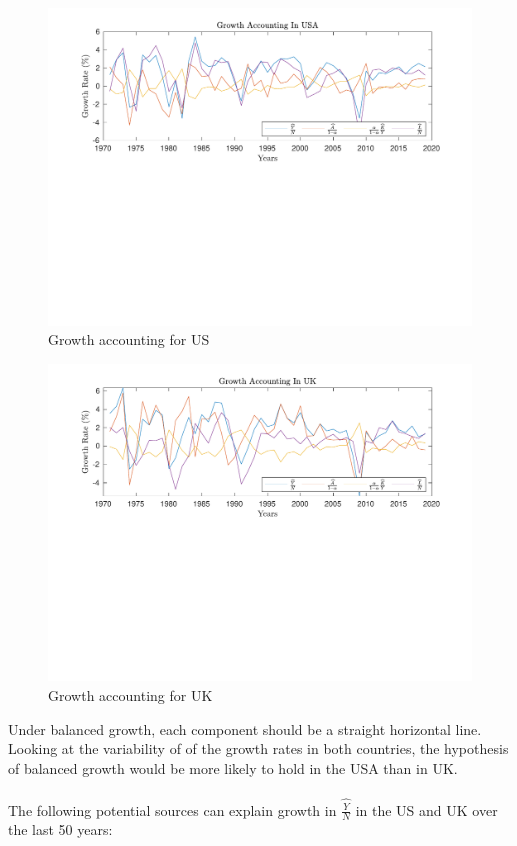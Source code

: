 \documentclass[11pt]{article}
\theoremstyle{mytheoremstyle}
\theoremstyle{mytheoremstyle}
\theoremstyle{myproblemstyle}
\begin{document}
\begin{figure}[htbp]
    \includegraphics[trim = 0in 3.2in 0in 0in, clip, width=1\textwidth]{out/Growth_Accounting_us.pdf}
    \caption{Growth accounting for US}
\end{figure}

\begin{figure}[htbp]
    \includegraphics[trim = 0in 3.2in 0in 0in, clip, width=1\textwidth]{out/Growth_Accounting_uk.pdf}
    \caption{Growth accounting for UK}
\end{figure}

Under balanced growth, each component should be a straight horizontal line. Looking at the variability of of the growth rates in both countries, the hypothesis of balanced growth would
be more likely to hold in the USA than in UK.
\\ \\ 
The following potential sources can explain growth in $\widehat{\frac{Y}{N}}$ in the US and UK over the last 50 years:
\end{document}
